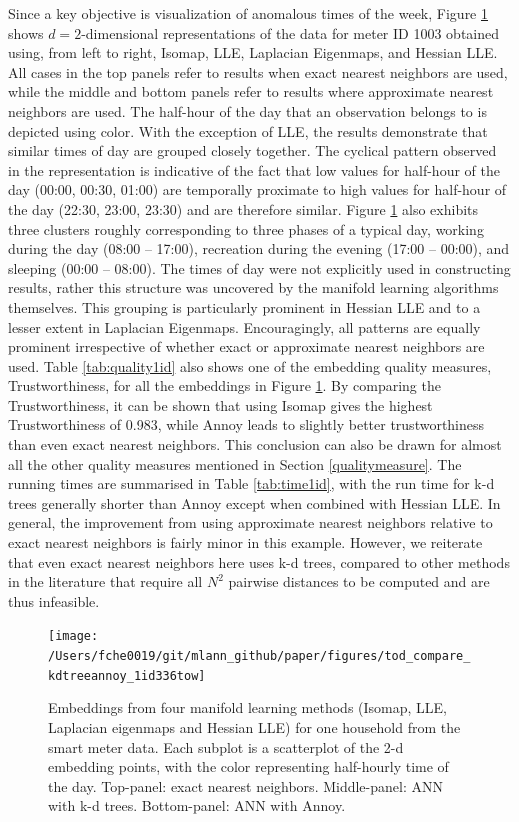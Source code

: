 \documentclass[11pt,a4paper,]{article}
\begin{document}
Since a key objective is visualization of anomalous times of the week, Figure \ref{fig:todplot} shows \(d=2\)-dimensional representations of the data for meter ID 1003 obtained using, from left to right, Isomap, LLE, Laplacian Eigenmaps, and Hessian LLE. All cases in the top panels refer to results when exact nearest neighbors are used, while the middle and bottom panels refer to results where approximate nearest neighbors are used. The half-hour of the day that an observation belongs to is depicted using color. With the exception of LLE, the results demonstrate that similar times of day are grouped closely together. The cyclical pattern observed in the representation is indicative of the fact that low values for half-hour of the day (00:00, 00:30, 01:00) are temporally proximate to high values for half-hour of the day (22:30, 23:00, 23:30) and are therefore similar. Figure \ref{fig:todplot} also exhibits three clusters roughly corresponding to three phases of a typical day, working during the day (08:00 -- 17:00), recreation during the evening (17:00 -- 00:00), and sleeping (00:00 -- 08:00). The times of day were not explicitly used in constructing results, rather this structure was uncovered by the manifold learning algorithms themselves. This grouping is particularly prominent in Hessian LLE and to a lesser extent in Laplacian Eigenmaps. Encouragingly, all patterns are equally prominent irrespective of whether exact or approximate nearest neighbors are used.
Table \ref{tab:quality1id} also shows one of the embedding quality measures, Trustworthiness, for all the embeddings in Figure \ref{fig:todplot}. By comparing the Trustworthiness, it can be shown that using Isomap gives the highest Trustworthiness of 0.983, while Annoy leads to slightly better trustworthiness than even exact nearest neighbors. This conclusion can also be drawn for almost all the other quality measures mentioned in Section \ref{qualitymeasure}. The running times are summarised in Table \ref{tab:time1id}, with the run time for k-d trees generally shorter than Annoy except when combined with Hessian LLE. In general, the improvement from using approximate nearest neighbors relative to exact nearest neighbors is fairly minor in this example. However, we reiterate that even exact nearest neighbors here uses k-d trees, compared to other methods in the literature that require all \(N^2\) pairwise distances to be computed and are thus infeasible.

\begin{figure}

{\centering \texttt{[image: /Users/fche0019/git/mlann\_github/paper/figures/tod\_compare\_kdtreeannoy\_1id336tow]} 

}

\caption{Embeddings from four manifold learning methods (Isomap, LLE, Laplacian eigenmaps and Hessian LLE) for one household from the smart meter data. Each subplot is a scatterplot of the 2-d embedding points, with the color representing half-hourly time of the day. Top-panel: exact nearest neighbors. Middle-panel: ANN with k-d trees. Bottom-panel: ANN with Annoy.}\label{fig:todplot}
\end{figure}
\end{document}
